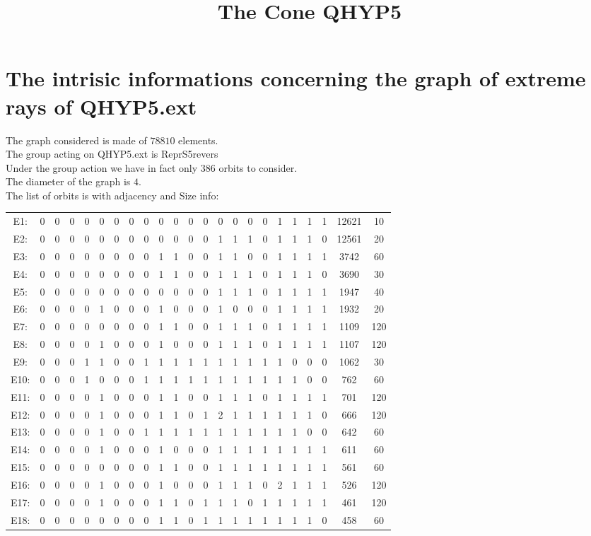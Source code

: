 \documentclass[12pt]{article}
\title{The Cone QHYP5}
\begin{document}
\maketitle
\section{The intrisic informations concerning the graph of extreme rays of QHYP5.ext}
The graph considered is made of $78810$ elements.\\
The group acting on QHYP5.ext is ReprS5revers\\
Under the group action we have in fact only $386$ orbits to consider.\\
The diameter of the graph is $4$.\\
The list of orbits is with adjacency and Size info:
\begin{center}
\scriptsize
\begin{tabular}{ccccccccccccccccccccc|c|c}
E1:&0&0&0&0&0&0&0&0&0&0&0&0&0&0&0&0&1&1&1&1&12621&10\\
E2:&0&0&0&0&0&0&0&0&0&0&0&0&1&1&1&0&1&1&1&0&12561&20\\
E3:&0&0&0&0&0&0&0&0&1&1&0&0&1&1&0&0&1&1&1&1&3742&60\\
E4:&0&0&0&0&0&0&0&0&1&1&0&0&1&1&1&0&1&1&1&0&3690&30\\
E5:&0&0&0&0&0&0&0&0&0&0&0&0&1&1&1&0&1&1&1&1&1947&40\\
E6:&0&0&0&0&1&0&0&0&1&0&0&0&1&0&0&0&1&1&1&1&1932&20\\
E7:&0&0&0&0&0&0&0&0&1&1&0&0&1&1&1&0&1&1&1&1&1109&120\\
E8:&0&0&0&0&1&0&0&0&1&0&0&0&1&1&1&0&1&1&1&1&1107&120\\
E9:&0&0&0&1&1&0&0&1&1&1&1&1&1&1&1&1&1&0&0&0&1062&30\\
E10:&0&0&0&1&0&0&0&1&1&1&1&1&1&1&1&1&1&1&0&0&762&60\\
E11:&0&0&0&0&1&0&0&0&1&1&0&0&1&1&1&0&1&1&1&1&701&120\\
E12:&0&0&0&0&1&0&0&0&1&1&0&1&2&1&1&1&1&1&1&0&666&120\\
E13:&0&0&0&0&1&0&0&1&1&1&1&1&1&1&1&1&1&1&0&0&642&60\\
E14:&0&0&0&0&1&0&0&0&1&0&0&0&1&1&1&1&1&1&1&1&611&60\\
E15:&0&0&0&0&0&0&0&0&1&1&0&0&1&1&1&1&1&1&1&1&561&60\\
E16:&0&0&0&0&1&0&0&0&1&0&0&0&1&1&1&0&2&1&1&1&526&120\\
E17:&0&0&0&0&1&0&0&0&1&1&0&1&1&1&0&1&1&1&1&1&461&120\\
E18:&0&0&0&0&0&0&0&0&1&1&0&1&1&1&1&1&1&1&1&0&458&60\\

\end{tabular}
\end{center}
\end{document}
